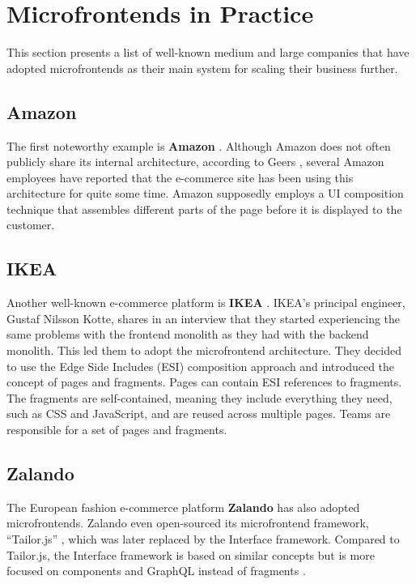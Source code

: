 \section{Microfrontends in Practice}
This section presents a list of well-known medium and large companies that have adopted microfrontends as their main system for scaling their business further. \\

\subsection{Amazon}
The first noteworthy example is \textbf{Amazon} \cite{Amazon}. Although Amazon does not often publicly share its internal architecture, according to Geers \cite{Geers}, several Amazon employees have reported that the e-commerce site has been using this architecture for quite some time. Amazon supposedly employs a UI composition technique that assembles different parts of the page before it is displayed to the customer. \\

\subsection{IKEA}
Another well-known e-commerce platform is \textbf{IKEA} \cite{IKEA}. IKEA's principal engineer, Gustaf Nilsson Kotte, shares in an interview \cite{StenbergIkea} that they started experiencing the same problems with the frontend monolith as they had with the backend monolith. This led them to adopt the microfrontend architecture. They decided to use the Edge Side Includes (ESI) composition approach and introduced the concept of pages and fragments. Pages can contain ESI references to fragments. The fragments are self-contained, meaning they include everything they need, such as CSS and JavaScript, and are reused across multiple pages. Teams are responsible for a set of pages and fragments. \\

\subsection{Zalando}
The European fashion e-commerce platform \textbf{Zalando} \cite{Zalando} has also adopted microfrontends. Zalando even open-sourced its microfrontend framework, ``Tailor.js'' \cite{TailorJs}, which was later replaced by the Interface framework. Compared to Tailor.js, the Interface framework is based on similar concepts but is more focused on components and GraphQL instead of fragments \cite{MezzaliraBuildingMf}.\\

